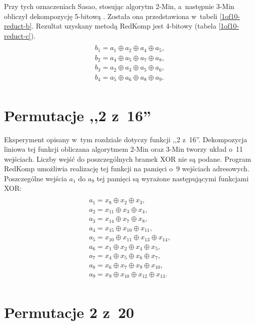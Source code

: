 Przy tych oznaczeniach Sasao,
stosując algorytm 2-Min,
a~następnie 3-Min obliczył dekompozycję 5-bitową \cite{sasao-s-min}.
Została ona przedstawiona w~tabeli \ref{1of10-reduct-b}.
Rezultat uzyskany metodą RedKomp jest 4-bitowy (tabela \ref{1of10-reduct-c}).
\begin{multline} \\
b_1 = a_1 \oplus a_2 \oplus a_4 \oplus a_5, \\
b_2 = a_4 \oplus a_5 \oplus a_7 \oplus a_8, \\
b_3 = a_2 \oplus a_3 \oplus a_5 \oplus a_6, \\
b_4 = a_5 \oplus a_6 \oplus a_8 \oplus a_9. \\
\end{multline}




\section{Permutacje ,,2 z~16''}

Eksperyment opisany w~tym rozdziale dotyczy funkcji ,,2 z~16''.
Dekompozycja liniowa tej funkcji obliczana algorytmem 2-Min oraz 3-Min \cite{sasao-s-min} tworzy układ o~11 wejściach.
Liczby wejść do poszczególnych bramek XOR nie są podane.
Program RedKomp umożliwia realizację tej funkcji na pamięci o~9 wejściach adresowych.
Poszczególne wejścia $a_1$ do $a_9$ tej pamięci są wyrażone następującymi funkcjami XOR:
\begin{multline} \\
a_1 = x_8 \oplus x_2 \oplus x_3, \\
a_2 = x_{11} \oplus x_3 \oplus x_4, \\
a_3 = x_{14} \oplus x_7 \oplus x_8, \\
a_4 = x_{15} \oplus x_{10} \oplus x_{11}, \\
a_5 = x_{10} \oplus x_{11} \oplus x_{13} \oplus x_{14}, \\
a_6 = x_1 \oplus x_2 \oplus x_4 \oplus x_5, \\
a_7 = x_4 \oplus x_5 \oplus x_6 \oplus x_7, \\
a_8 = x_6 \oplus x_7 \oplus x_9 \oplus x_{10}, \\
a_9 = x_9 \oplus x_{10} \oplus x_{12} \oplus x_{13}. \\
\end{multline}

\section{Permutacje 2 z~20}

